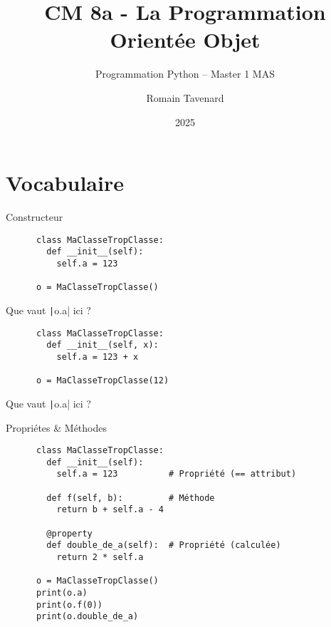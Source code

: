 \documentclass[10pt]{beamer}
\title[M1 MAS -- Python -- POO]{CM 8a - La Programmation Orientée Objet}
\subtitle{Programmation Python -- Master 1 MAS}
\author{Romain Tavenard}
\date{2025}
\institute{%
\hypersetup{urlcolor=.}
\makebox[2.2ex][c]{\faEnvelope}\enspace\href{mailto:romain.tavenard@univ-rennes2.fr}{\texttt{romain.tavenard@univ-rennes2.fr}}\\%
}
\begin{document}
\maketitle

\section{Vocabulaire}

\begin{frame}[fragile]{Constructeur}
  \begin{beamercodeblock}
    \begin{verbatim}
      class MaClasseTropClasse:
        def __init__(self):
          self.a = 123

      o = MaClasseTropClasse()
    \end{verbatim}
  \end{beamercodeblock}

  Que vaut \texttt|o.a| ici ?

  \begin{beamercodeblock}
    \begin{verbatim}
      class MaClasseTropClasse:
        def __init__(self, x):
          self.a = 123 + x

      o = MaClasseTropClasse(12)
    \end{verbatim}
  \end{beamercodeblock}

  Que vaut \texttt|o.a| ici ?
\end{frame}

\begin{frame}[fragile]{Propriétes \& Méthodes}
  \begin{beamercodeblock}
    \begin{verbatim}
      class MaClasseTropClasse:
        def __init__(self):
          self.a = 123          # Propriété (== attribut)
        
        def f(self, b):         # Méthode
          return b + self.a - 4

        @property
        def double_de_a(self):  # Propriété (calculée)
          return 2 * self.a

      o = MaClasseTropClasse()
      print(o.a)
      print(o.f(0))
      print(o.double_de_a)
    \end{verbatim}
  \end{beamercodeblock}
\end{frame}
\end{document}
